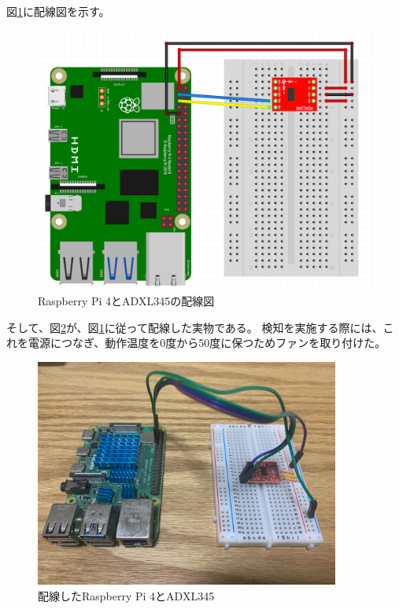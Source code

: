 図\ref{fig:meal_detector_wire_illustration}に配線図を示す。

\begin{figure}[htbp]
  \caption{Raspberry Pi 4とADXL345の配線図}
  \label{fig:meal_detector_wire_illustration}
  \begin{center}
    \includegraphics[bb=0 0 1000 800,width=15cm]{assets/raspi_adxl345.png}
  \end{center}
\end{figure}

そして、図\ref{fig:meal_detector}が、図\ref{fig:meal_detector_wire_illustration}に従って配線した実物である。
検知を実施する際には、これを電源につなぎ、動作温度を0度から50度に保つためファンを取り付けた。\cite{raspi_4_heat} \cite{raspi_4_spec}

\begin{figure}[htbp]
  \caption{配線したRaspberry Pi 4とADXL345}
  \label{fig:meal_detector}
  \begin{center}
    \includegraphics[bb=0 0 1300 1100,width=10cm]{assets/meal_detector.jpg}
  \end{center}
\end{figure}


